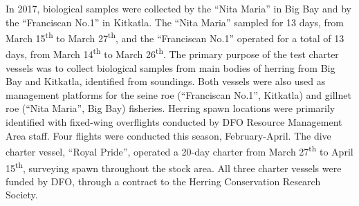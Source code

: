 In 2017, biological samples were collected by the ``Nita Maria'' in Big Bay and by the ``Franciscan No.1'' in Kitkatla.
The ``Nita Maria'' sampled for 13 days, from March 15\textsuperscript{th} to March 27\textsuperscript{th}, and the ``Franciscan No.1'' operated for a total of 13 days, from March 14\textsuperscript{th} to March 26\textsuperscript{th}.
The primary purpose of the test charter vessels was to collect biological samples from main bodies of herring from Big Bay and Kitkatla, identified from soundings.
Both vessels were also used as management platforms for the seine roe (``Franciscan No.1'', Kitkatla) and gillnet roe (``Nita Maria'', Big Bay) fisheries.
Herring spawn locations were primarily identified with fixed-wing overflights conducted by DFO Resource Management Area staff.
Four flights were conducted this season, February-April.
The dive charter vessel, ``Royal Pride'', operated a 20-day charter from March 27\textsuperscript{th} to April 15\textsuperscript{th}, surveying spawn throughout the stock area.
All three charter vessels were funded by DFO, through a contract to the Herring Conservation Research Society.